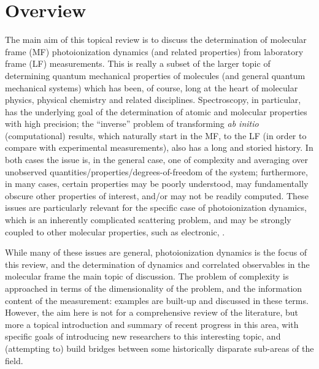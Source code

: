 \section{Overview}
The main aim of this topical review is to discuss the determination of molecular frame (MF) photoionization dynamics (and related properties) from laboratory frame (LF) measurements. This is really a subset of the larger topic of determining quantum mechanical properties of molecules (and general quantum mechanical systems) which has been, of course, long at the heart of molecular physics, physical chemistry and related disciplines. Spectroscopy, in particular, has the underlying goal of the determination of atomic and molecular properties with high precision; the “inverse” problem of transforming \textit{ab initio} (computational) results, which naturally start in the MF, to the LF (in order to compare with experimental measurements), also has a long and storied history. In both cases the issue is, in the general case, one of complexity and averaging over unobserved quantities/properties/degrees-of-freedom of the system; furthermore, in many cases, certain properties may be poorly understood, may fundamentally obscure other properties of interest, and/or may not be readily computed. These issues are particularly relevant for the specific case of photoionization dynamics, which is an inherently complicated scattering problem, and may be strongly coupled to other molecular properties, such as electronic, . 

While many of these issues are general, photoionization dynamics is the focus of this review, and the determination of dynamics and correlated observables in the molecular frame the main topic of discussion. The problem of complexity is approached in terms of the dimensionality of the problem, and the information content of the measurement: examples are built-up and discussed in these terms. However, the aim here is not for a comprehensive review of the literature, but more a topical introduction and summary of recent progress in this area, with specific goals of introducing new researchers to this interesting topic, and (attempting to) build bridges between some historically disparate sub-areas of the field.